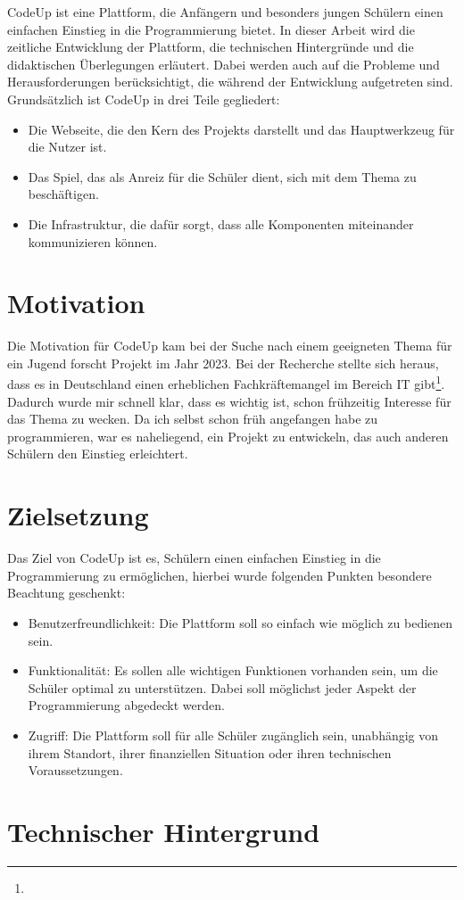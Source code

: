 \documentclass[main.tex]{subfiles}
\begin{document}
    CodeUp ist eine Plattform, die Anfängern und besonders jungen Schülern einen einfachen Einstieg in die Programmierung bietet.
    In dieser Arbeit wird die zeitliche Entwicklung der Plattform, die technischen Hintergründe und die didaktischen Überlegungen erläutert.
    Dabei werden auch auf die Probleme und Herausforderungen berücksichtigt, die während der Entwicklung aufgetreten sind.
    Grundsätzlich ist CodeUp in drei Teile gegliedert:
    \begin{itemize}
        \item Die Webseite, die den Kern des Projekts darstellt und das Hauptwerkzeug für die Nutzer ist.
        \item Das Spiel, das als Anreiz für die Schüler dient, sich mit dem Thema zu beschäftigen.
        \item Die Infrastruktur, die dafür sorgt, dass alle Komponenten miteinander kommunizieren können.
    \end{itemize}
    \section{Motivation}
    Die Motivation für CodeUp kam bei der Suche nach einem geeigneten Thema für ein Jugend forscht Projekt im Jahr 2023.
    Bei der Recherche stellte sich heraus, dass es in Deutschland einen erheblichen Fachkräftemangel im Bereich IT gibt\footnote{}.
    Dadurch wurde mir schnell klar, dass es wichtig ist, schon frühzeitig Interesse für das Thema zu wecken.
    Da ich selbst schon früh angefangen habe zu programmieren, war es naheliegend, ein Projekt zu entwickeln, das auch anderen Schülern den Einstieg erleichtert.
    \section{Zielsetzung}
    Das Ziel von CodeUp ist es, Schülern einen einfachen Einstieg in die Programmierung zu ermöglichen, hierbei wurde folgenden Punkten besondere Beachtung geschenkt:
    \begin{itemize}
        \item Benutzerfreundlichkeit: Die Plattform soll so einfach wie möglich zu bedienen sein.
        \item Funktionalität: Es sollen alle wichtigen Funktionen vorhanden sein, um die Schüler optimal zu unterstützen.
        Dabei soll möglichst jeder Aspekt der Programmierung abgedeckt werden.
        \item Zugriff: Die Plattform soll für alle Schüler zugänglich sein, unabhängig von ihrem Standort, ihrer finanziellen Situation oder ihren technischen Voraussetzungen.
    \end{itemize}
    \section{Technischer Hintergrund}
\end{document}
